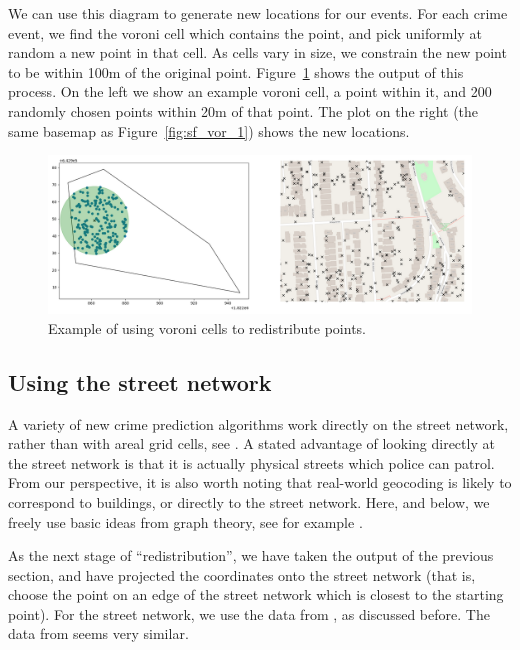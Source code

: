 \documentclass[twoside,a4paper,twocolumn,10pt]{article}
\theoremstyle{plain}
\theoremstyle{definition}
\begin{document}
We can use this diagram to generate new locations for our events.  For each crime event,
we find the voroni cell which contains the point, and pick uniformly at random a new point
in that cell.  As cells vary in size, we constrain the new point to be within 100m of the
original point.  Figure~\ref{fig:sf_vor_2} shows the output of this process.  On the left
we show an example voroni cell, a point within it, and 200 randomly chosen points within 20m
of that point.  The plot on the right (the same basemap as Figure~\ref{fig:sf_vor_1})
shows the new locations.

\begin{figure}
  \includegraphics[width=\textwidth]{sf_vor_2.png}
  \caption{Example of using voroni cells to redistribute points.}
  \label{fig:sf_vor_2}
\end{figure}


\subsection{Using the street network}

A variety of new crime prediction algorithms work directly on the street network, rather
than with areal grid cells, see \cite{rosser_nw, ss}.
A stated advantage of looking directly at the street network is that it is actually
physical streets which police can patrol.  From our perspective, it is also worth noting
that real-world geocoding is likely to correspond to buildings, or directly to
the street network.  Here, and below, we freely use basic ideas from graph theory, see
for example \cite{wilson}.

As the next stage of ``redistribution'', we have taken the output of the previous section,
and have projected the coordinates onto the street network (that is, choose the point on an
edge of the street network which is closest to the starting point).  For the street network, we use
the data from \cite{sfgeo}, as discussed before.  The data from \cite{tiger} seems very similar.
\end{document}
